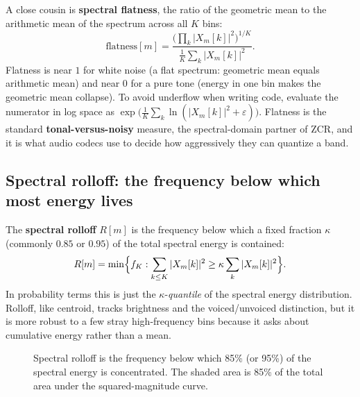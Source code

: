 A close cousin is \textbf{spectral flatness}, the ratio of the geometric mean to
the arithmetic mean of the spectrum across all $K$ bins:
\begin{equation}
\label{ch27:flatness-defn}
\text{flatness}[m] =
  \frac{\bigl(\prod_k |X_m[k]|^2\bigr)^{1/K}}
       {\frac{1}{K}\sum_k |X_m[k]|^2}.
\end{equation}
Flatness is near $1$ for white noise (a flat spectrum: geometric mean equals
arithmetic mean) and near $0$ for a pure tone (energy in one bin makes the
geometric mean collapse). To avoid underflow when writing code, evaluate the numerator in log space as $\exp\bigl(\frac{1}{K}\sum_k \ln(|X_m[k]|^2+\varepsilon)\bigr)$. Flatness is the standard \textbf{tonal-versus-noisy} measure,
the spectral-domain partner of ZCR, and it is what audio codecs use to decide how
aggressively they can quantize a band.

\subsection*{Spectral rolloff: the frequency below which most energy lives}

The \textbf{spectral rolloff} $R[m]$ is the frequency below which a fixed fraction
$\kappa$ (commonly $0.85$ or $0.95$) of the total spectral energy is contained:
\begin{equation}
\label{ch27:rolloff-defn}
R[m] = \min\Bigl\{ f_K : \sum_{k \le K} |X_m[k]|^2
                          \ge \kappa \sum_{k} |X_m[k]|^2 \Bigr\}.
\end{equation}
In probability terms this is just the $\kappa$-\emph{quantile} of the spectral
energy distribution. Rolloff, like centroid, tracks brightness and the
voiced/unvoiced distinction, but it is more robust to a few stray
high-frequency bins because it asks about cumulative energy rather than a mean.

\begin{figure}[H]
\centering
{}
\caption{Spectral rolloff is the frequency below which 85\% (or 95\%) of the spectral energy is concentrated. The shaded area is 85\% of the total area under the squared-magnitude curve.}
\label{ch27:fig-rolloff}
\end{figure}

